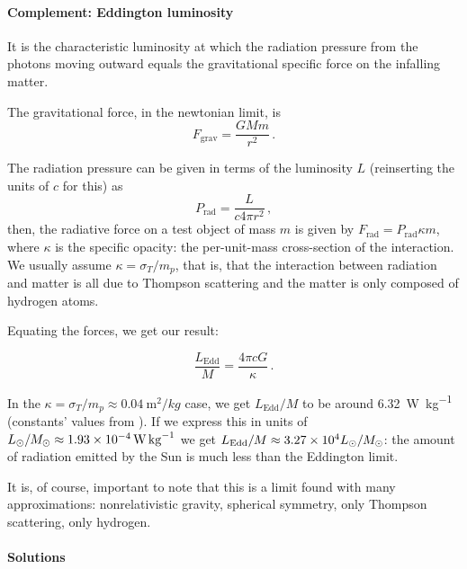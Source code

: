 \documentclass[main.tex]{subfiles}
\begin{document}
\paragraph{Complement: Eddington luminosity}

It is the characteristic luminosity at which the radiation pressure from the photons moving outward equals the gravitational specific force on the infalling matter.

The gravitational force, in the newtonian  limit, is
%
\begin{equation}
  F_{\text{grav}} = \frac{GMm}{r^2 }\,.
\end{equation}

The radiation pressure can be given in terms of the luminosity \(L\) (reinserting the units of \(c\) for this) as
%
\begin{equation}
  P_{\text{rad}} = \frac{L}{c 4 \pi r^2}\,,
\end{equation}
then, the radiative force on a test object of mass \(m\) is given by \(F_{\text{rad}} =  P_{\text{rad}} \kappa m\), where \(\kappa\) is the specific opacity: the per-unit-mass cross-section of the interaction. We usually assume \(\kappa = \sigma_T/m_p\), that is, that the interaction between radiation and matter is all due to Thompson scattering and the matter is only composed of hydrogen atoms.

Equating the forces, we get our result:

\begin{equation}
 \frac{L_{\text{Edd}}}{M} = \frac{4 \pi c G}{\kappa}\,.
\end{equation}

In the \(\kappa = \sigma_T / m_p \approx \SI{0.04}{\metre^2 / kg}\) case, we get \(L_{\text{Edd}} / M\) to be around \SI{6.32}{\watt\per\kilo\gram} (constants' values from \cite[]{NISTReccomendedConstants:2018}).
If we express this in units of \(L_{\odot} / M_{\odot} \approx \SI{1.93E-04}{\watt\per\kilo\gram}\) \cite[]{SunFactSheet:2018} we get \(L_{\text{Edd}} / M \approx  \num{3.27E+04} L_{\odot} / M_{\odot}\):
the amount of radiation emitted by the Sun is much less than the Eddington limit.

It is, of course, important to note that this is a limit found with many approximations: nonrelativistic gravity, spherical symmetry, only Thompson scattering,
only hydrogen.

\paragraph{Solutions}
\end{document}
